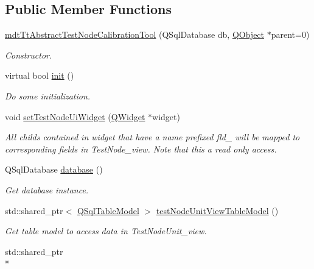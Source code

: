 \subsection*{Public Member Functions}
\begin{DoxyCompactItemize}
\item 
\hyperlink{classmdt_tt_abstract_test_node_calibration_tool_af74473766d512098c3e528e4f5865ade}{mdt\-Tt\-Abstract\-Test\-Node\-Calibration\-Tool} (Q\-Sql\-Database db, \hyperlink{class_q_object}{Q\-Object} $\ast$parent=0)
\begin{DoxyCompactList}\small\item\em Constructor. \end{DoxyCompactList}\item 
virtual bool \hyperlink{classmdt_tt_abstract_test_node_calibration_tool_a7ad90715222060f29c01c13bc4bbf417}{init} ()
\begin{DoxyCompactList}\small\item\em Do some initialization. \end{DoxyCompactList}\item 
void \hyperlink{classmdt_tt_abstract_test_node_calibration_tool_a7fab42cef3cbbfe711adaf684d1f5af8}{set\-Test\-Node\-Ui\-Widget} (\hyperlink{class_q_widget}{Q\-Widget} $\ast$widget)
\begin{DoxyCompactList}\small\item\em All childs contained in widget that have a name prefixed fld\-\_\- will be mapped to corresponding fields in Test\-Node\-\_\-view. Note that this a read only access. \end{DoxyCompactList}\item 
Q\-Sql\-Database \hyperlink{classmdt_tt_abstract_test_node_calibration_tool_abd953e46ec2e7d2295ec03cd697ffd7e}{database} ()
\begin{DoxyCompactList}\small\item\em Get database instance. \end{DoxyCompactList}\item 
std\-::shared\-\_\-ptr$<$ \hyperlink{class_q_sql_table_model}{Q\-Sql\-Table\-Model} $>$ \hyperlink{classmdt_tt_abstract_test_node_calibration_tool_a5a82c1c133acc47083def43ec45e76f9}{test\-Node\-Unit\-View\-Table\-Model} ()
\begin{DoxyCompactList}\small\item\em Get table model to access data in Test\-Node\-Unit\-\_\-view. \end{DoxyCompactList}\item 
std\-::shared\-\_\-ptr\\*

\end{DoxyCompactItemize}

